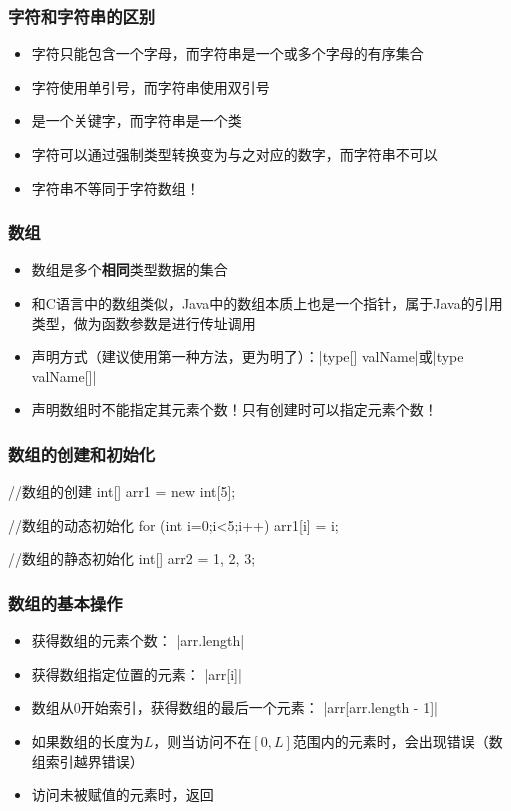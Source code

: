\begin{frame}
  \frametitle{字符和字符串的区别}
  \begin{itemize}
    \item 字符只能包含一个字母，而字符串是一个或多个字母的有序集合
    \item 字符使用单引号，而字符串使用双引号
    \item {}是一个关键字，而字符串是一个类
    \item 字符可以通过强制类型转换变为与之对应的数字，而字符串不可以
    \item 字符串不等同于字符数组！
  \end{itemize}
\end{frame}

\begin{frame}
  \frametitle{数组}
  \begin{itemize}
    \item 数组是多个\textbf{相同}类型数据的集合
    \item 和C语言中的数组类似，Java中的数组本质上也是一个指针，属于Java的引用类型，做为函数参数是进行传址调用
    \item 声明方式（建议使用第一种方法，更为明了）：\java|type[] valName|或\java|type valName[]|
    \item 声明数组时不能指定其元素个数！只有创建时可以指定元素个数！
  \end{itemize}
\end{frame}

\begin{frame}[fragile]
  \frametitle{数组的创建和初始化}
  \begin{javacode}
   //数组的创建
  int[] arr1 = new int[5];
  
  //数组的动态初始化
  for (int i=0;i<5;i++) {
    arr1[i] = i; 
  }
  
  //数组的静态初始化
  int[] arr2 = {1, 2, 3};
  \end{javacode}

\end{frame}

\begin{frame}
  \frametitle{数组的基本操作}
  \begin{itemize}
    \item 获得数组的元素个数：
    \java|arr.length|
    \item 获得数组指定位置的元素：
    \java|arr[i]|
    \item 数组从0开始索引，获得数组的最后一个元素：
    \java|arr[arr.length - 1]|
    \item 如果数组的长度为$L$，则当访问不在$[0, L]$范围内的元素时，会出现错误（数组索引越界错误）
    \item 访问未被赋值的元素时，返回
  \end{itemize}
\end{frame}

